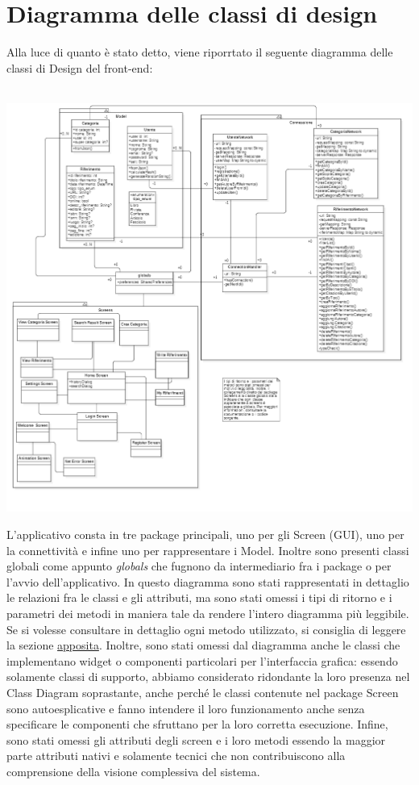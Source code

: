 {\raggedright{\section{Diagramma delle classi di design}}
Alla luce di quanto è stato detto, viene riporrtato il seguente diagramma delle classi di Design del front-end: 
\\~\\
        \begin{center}
            \includegraphics[width=.95\textwidth]{Immagini/Alexandria/UML Design.PNG} 
        \end{center}
L'applicativo consta in tre package principali, uno per gli Screen (GUI), uno per la connettività e infine uno per rappresentare i Model. Inoltre sono presenti classi globali come appunto \textit{globals} che fugnono da intermediario fra i package o per l'avvio dell'applicativo. In questo diagramma sono stati rappresentati in dettaglio le relazioni fra le classi e gli attributi, ma sono stati omessi i tipi di ritorno e i parametri dei metodi in maniera tale da rendere l'intero diagramma più leggibile. Se si volesse consultare in dettaglio ogni metodo utilizzato, si consiglia di leggere la sezione \hyperref[sourceCode]{apposita}. Inoltre, sono stati omessi dal diagramma anche le classi che implementano widget o componenti particolari per l'interfaccia grafica: essendo solamente classi di supporto, abbiamo considerato ridondante la loro presenza nel Class Diagram soprastante, anche perché le classi contenute nel package Screen sono autoesplicative e fanno intendere il loro funzionamento anche senza specificare le componenti che sfruttano per la loro corretta esecuzione. Infine, sono stati omessi gli attributi degli screen e i loro metodi essendo la maggior parte attributi nativi e solamente tecnici che non contribuiscono alla comprensione della visione complessiva del sistema.


}
